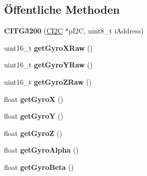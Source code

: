 \subsection*{Öffentliche \-Methoden}
\begin{DoxyCompactItemize}
\item 
\hypertarget{class_c_i_t_g3200_a3444eeb18a710346f95618264ca777be}{{\bfseries \-C\-I\-T\-G3200} (\hyperlink{class_c_i2_c}{\-C\-I2\-C} $\ast$p\-I2\-C, uint8\-\_\-t i\-Address)}\label{class_c_i_t_g3200_a3444eeb18a710346f95618264ca777be}

\item 
\hypertarget{class_c_i_t_g3200_a1f89d5f27aa435914ccb5bf821b1627c}{uint16\-\_\-t {\bfseries get\-Gyro\-X\-Raw} ()}\label{class_c_i_t_g3200_a1f89d5f27aa435914ccb5bf821b1627c}

\item 
\hypertarget{class_c_i_t_g3200_ac80a3dd95530de6ebdc11196f7d6b87f}{uint16\-\_\-t {\bfseries get\-Gyro\-Y\-Raw} ()}\label{class_c_i_t_g3200_ac80a3dd95530de6ebdc11196f7d6b87f}

\item 
\hypertarget{class_c_i_t_g3200_ae8ff101a3e68f6c607594666263e27f7}{uint16\-\_\-t {\bfseries get\-Gyro\-Z\-Raw} ()}\label{class_c_i_t_g3200_ae8ff101a3e68f6c607594666263e27f7}

\item 
\hypertarget{class_c_i_t_g3200_a1789a681319d8190770bce195bed22de}{float {\bfseries get\-Gyro\-X} ()}\label{class_c_i_t_g3200_a1789a681319d8190770bce195bed22de}

\item 
\hypertarget{class_c_i_t_g3200_acb51f15de2debbaf262ccd56aebff0dc}{float {\bfseries get\-Gyro\-Y} ()}\label{class_c_i_t_g3200_acb51f15de2debbaf262ccd56aebff0dc}

\item 
\hypertarget{class_c_i_t_g3200_a93b6f4ee7ba87f27d336f9e4e196e4b0}{float {\bfseries get\-Gyro\-Z} ()}\label{class_c_i_t_g3200_a93b6f4ee7ba87f27d336f9e4e196e4b0}

\item 
\hypertarget{class_c_i_t_g3200_a47d4044a6c4d6b4d197cc93da051c61b}{float {\bfseries get\-Gyro\-Alpha} ()}\label{class_c_i_t_g3200_a47d4044a6c4d6b4d197cc93da051c61b}

\item 
\hypertarget{class_c_i_t_g3200_abeba2a2808df982d93e4bdc98c8310eb}{float {\bfseries get\-Gyro\-Beta} ()}\label{class_c_i_t_g3200_abeba2a2808df982d93e4bdc98c8310eb}


\end{DoxyCompactItemize}
